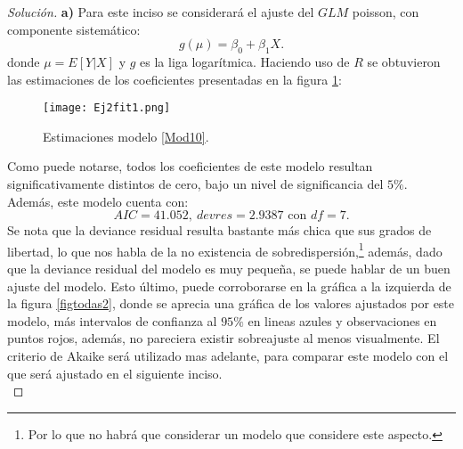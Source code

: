 \documentclass[10.5pt,notitlepage]{article}
\newenvironment{solucion}
  {\begin{proof}[Solución]}
  {\end{proof}}
\theoremstyle{plain}
\begin{document}
\begin{exo}

\end{exo}
\begin{solucion}
\textbf{a)} Para este inciso se considerará el ajuste del \(GLM\) poisson, con componente sistemático: 
\begin{equation}\label{Mod10}
    g(\mu) = \beta_0 + \beta_1 X. 
\end{equation}
donde \(\mu = E[Y|X]\) y \(g\) es la liga logarítmica. Haciendo uso de \(R\) se obtuvieron las estimaciones de los coeficientes presentadas en la figura \ref{fig10}: 
\begin{figure}[htb]
    \centering
    \texttt{[image: Ej2fit1.png]}
    \caption{Estimaciones modelo \eqref{Mod10}.}
    \label{fig10}
\end{figure}
Como puede notarse, todos los coeficientes de este modelo resultan significativamente distintos de cero, bajo un nivel de significancia del \(5\%\). Además, este modelo cuenta  con: 
\begin{equation}\label{AIC10}
    AIC = 41.052, \ devres = 2.9387 \text{ con } df = 7.  
\end{equation}
Se nota que la deviance residual resulta bastante más chica que sus grados de libertad, lo que nos habla de la no existencia de sobredispersión,\footnote{Por lo que no habrá que considerar un modelo que considere este aspecto.} además, dado que la deviance residual del modelo es muy pequeña, se puede hablar de un buen ajuste del modelo. Esto último, puede corroborarse en la gráfica a la izquierda de la figura \ref{figtodas2}, donde se aprecia una gráfica de los valores ajustados por este modelo, más intervalos de confianza al \(95\%\) en lineas azules y observaciones en puntos rojos, además, no pareciera existir sobreajuste al menos visualmente. El criterio de Akaike será utilizado mas adelante, para comparar este modelo con el que será ajustado en el siguiente inciso. \\ 


\end{solucion}
\end{document}
